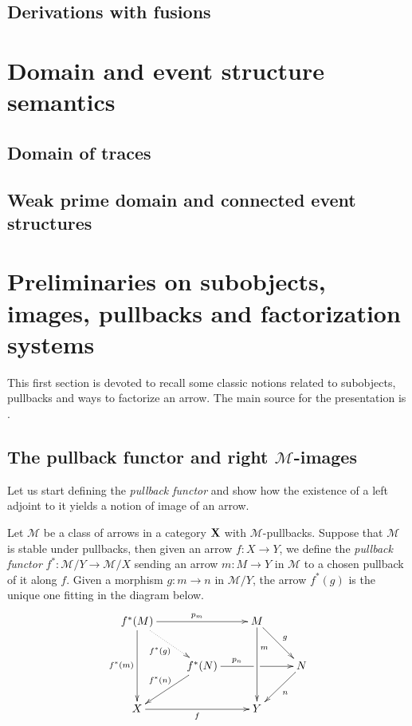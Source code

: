 \documentclass[a4paper,UKenglish,cleveref,pdftex,thm-restate,numberwithinsect]{lipics-v2021}
\def\X{\textbf {\textup{X}}}
\begin{document}
\subsection{Derivations with fusions}

\section{Domain and event structure semantics}
\subsection{Domain of traces}
\subsection{Weak prime domain and connected event structures}






\appendix

\section{Preliminaries on subobjects, images, pullbacks and factorization systems}\label{app:fact}


This first section is devoted to recall some classic notions related to subobjects, pullbacks and ways to factorize an arrow. The main source for the presentation is \cite[Ch.~1]{dikranjan2013categorical}.
\subsection{The pullback functor and right $\mathcal{M}$-images}

Let us start defining the \emph{pullback functor} and show how the existence of a left adjoint to it yields a notion of image of an arrow.

\begin{definition}
	Let $\mathcal{M}$ be a class of arrows in a category $\X$ with $\mathcal{M}$-pullbacks. Suppose that $\mathcal{M}$ is stable under pullbacks, then given an arrow $f\colon X\to Y$, we define the \emph{pullback functor} $f^*\colon \mathcal{M}/Y\to \mathcal{M}/X$ sending an arrow $m:M\to Y$ in $\mathcal{M}$ to a chosen pullback of it along $f$. Given a morphism $g:m\to n$ in $\mathcal{M}/Y$, the arrow $f^*(g)$ is the unique one fitting in the diagram below.
	\[\xymatrix{f^*(M)  \ar[dd]_{f^*(m)} \ar@{.>}[dr]_{f^*(g)}\ar[rr]^{p_m}&& M \ar[dr]^{g}\ar[dd]^(.3){m} \\&f^*(N)  \ar[rr]^(.35){p_n}|(.55)\hole \ar[dl]_{f^*(n)}&& N \ar[dl]^{n}\\ X \ar[rr]_{f}&& Y }\]
\end{definition}
\end{document}
